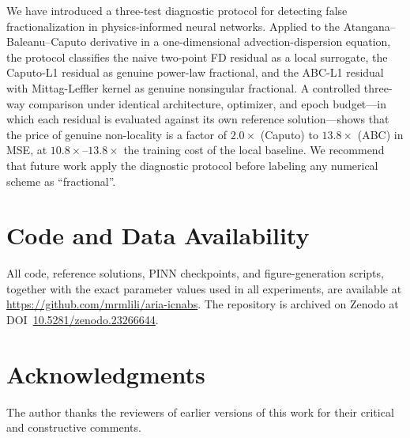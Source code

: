 \documentclass[11pt]{article}
\begin{document}
We have introduced a three-test diagnostic protocol for detecting false fractionalization in physics-informed neural networks. Applied to the Atangana--Baleanu--Caputo derivative in a one-dimensional advection-dispersion equation, the protocol classifies the naive two-point FD residual as a local surrogate, the Caputo-L1 residual as genuine power-law fractional, and the ABC-L1 residual with Mittag-Leffler kernel as genuine nonsingular fractional. A controlled three-way comparison under identical architecture, optimizer, and epoch budget---in which each residual is evaluated against its own reference solution---shows that the price of genuine non-locality is a factor of \(2.0\times\) (Caputo) to \(13.8\times\) (ABC) in MSE, at \(10.8\times\)--\(13.8\times\) the training cost of the local baseline. We recommend that future work apply the diagnostic protocol before labeling any numerical scheme as ``fractional''.

\section*{Code and Data Availability}
\label{sec:code}
All code, reference solutions, PINN checkpoints, and figure-generation scripts, together with the exact parameter values used in all experiments, are available at \url{https://github.com/mrmlili/aria-icnabs}. The repository is archived on Zenodo at DOI~\href{https://doi.org/10.5281/zenodo.23266644}{10.5281/zenodo.23266644}.

\section*{Acknowledgments}
The author thanks the reviewers of earlier versions of this work for their critical and constructive comments.
\end{document}
